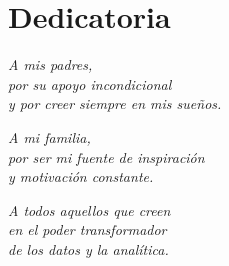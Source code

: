 
\chapter*{Dedicatoria}
\thispagestyle{empty}

\vspace{4cm}

\begin{flushright}
\textit{A mis padres, \\
por su apoyo incondicional \\
y por creer siempre en mis sueños.}

\vspace{1cm}

\textit{A mi familia, \\
por ser mi fuente de inspiración \\
y motivación constante.}

\vspace{1cm}

\textit{A todos aquellos que creen \\
en el poder transformador \\
de los datos y la analítica.}
\end{flushright}

\vfill

\newpage
